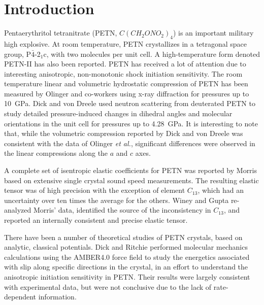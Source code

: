 \documentclass[prb,aps,nobibnotes,twocolumn,doublespace,twocolumngrid,superbib]{revtex4}
\begin{document}
\section{Introduction}
Pentaerythritol tetranitrate (PETN, $C(CH_2ONO_2)_4$) is an important 
military high explosive.  At room temperature, PETN crystallizes in a 
tetragonal space group, P$\bar{4}$-2$_1$c,  
with two molecules per unit
cell\cite{Trotter_1963v16,Conant_1979}.
A high-temperature 
form denoted PETN-II has also been reported\cite{Cady_1975vB41}.  
PETN has received a lot of attention due to interesting anisotropic, 
non-monotonic shock initiation 
sensitivity\cite{Gruzdkov_2000v104,Yoo_2000v88,Dick_1997v81,Gallagher_1992v339,Dick_1991v70,Dick_1994v4}.
The room temperature linear and volumetric hydrostatic compression
of PETN has been measured by Olinger and 
co-workers\cite{Olinger_1975v62,Olinger_1976} 
using x-ray diffraction for pressures up to 10~GPa. 
Dick and von Dreele\cite{Dick_1997} used neutron scattering from deuterated
PETN to study detailed pressure-induced changes in dihedral angles and
molecular orientations in the unit cell for pressures up to 4.28~GPa. 
It is interesting to note that, while the volumetric compression reported
by Dick and von Dreele was consistent with the data of Olinger {\it et al.},
significant differences were observed in the linear compressions along
the $a$ and $c$ axes.

A complete set of isentropic elastic coefficients for PETN was reported 
by Morris\cite{Morris_1976} based on
extensive single crystal sound speed measurements.  The resulting
elastic tensor was of high precision with the exception of element $C_{13}$,
which had an uncertainty over ten times the average for the others.
Winey and Gupta\cite{Winey_2001v90} 
re-analyzed Morris' data, identified the source of the inconsistency in 
$C_{13}$, and reported an internally consistent and precise elastic tensor.

There have been a number of theoretical studies of PETN crystals, 
based on analytic, classical potentials.
Dick and Ritchie\cite{Dick_1994,Ritchie_1993}
performed molecular 
mechanics calculations using the AMBER4.0 force field to study the energetics 
associated with slip along specific directions in the crystal, in an effort 
to understand the anisotropic initiation sensitivity in PETN.  Their results 
were largely consistent with experimental data, but were not conclusive due 
to the lack of rate-dependent information.  
\end{document}
